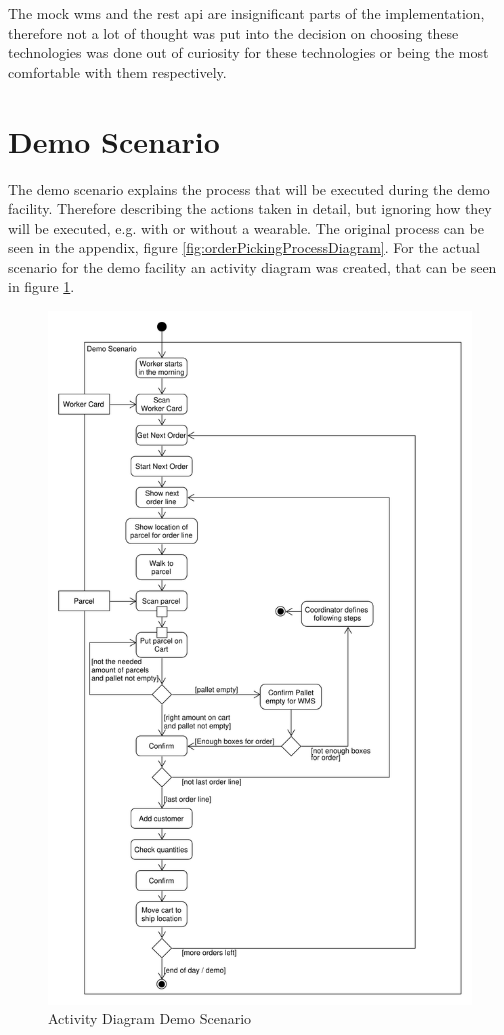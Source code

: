 The mock \gls{wms} and the \gls{rest} \gls{api} are insignificant parts of the implementation, therefore not a lot of thought was put into the decision on choosing these technologies was done out of curiosity for these technologies or being the most comfortable with them respectively.

\section{Demo Scenario}\label{sec:demoScenario}
The demo scenario explains the process that will be executed during the demo facility. Therefore describing the actions taken in detail, but ignoring how they will be executed, e.g. with or without a wearable. The original process can be seen in the appendix, figure \ref{fig:orderPickingProcessDiagram}. For the actual scenario for the demo facility an activity diagram was created, that can be seen in figure \ref{fig:activityDemoScenario}. 

\begin{figure}[htbp]
	\begin{center}
	\includegraphics[height=\textheight]{images/activityDiagram_demoScenarioNoExceptions}
	\end{center}	
	\caption{Activity Diagram Demo Scenario}
	\label{fig:activityDemoScenario}
\end{figure}

